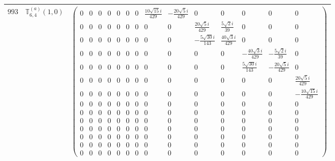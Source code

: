 \documentclass[fleqn,8pt,landscape]{jsarticle}
\begin{document}
\begin{center}
\begin{longtable}{ccc}
$ 993 $ & $ \mathbb{T}_{6,4}^{(a)}(1,0) $ & $ \begin{pmatrix} 0 & 0 & 0 & 0 & 0 & 0 & 0 & \frac{10 \sqrt{15} i}{429} & - \frac{20 \sqrt{5} i}{429} & 0 & 0 & 0 & 0 & 0 \\ 0 & 0 & 0 & 0 & 0 & 0 & 0 & 0 & 0 & \frac{20 \sqrt{5} i}{429} & \frac{5 \sqrt{2} i}{39} & 0 & 0 & 0 \\ 0 & 0 & 0 & 0 & 0 & 0 & 0 & 0 & 0 & - \frac{5 \sqrt{30} i}{143} & \frac{40 \sqrt{3} i}{429} & 0 & 0 & 0 \\ 0 & 0 & 0 & 0 & 0 & 0 & 0 & 0 & 0 & 0 & 0 & - \frac{40 \sqrt{3} i}{429} & - \frac{5 \sqrt{2} i}{39} & 0 \\ 0 & 0 & 0 & 0 & 0 & 0 & 0 & 0 & 0 & 0 & 0 & \frac{5 \sqrt{30} i}{143} & - \frac{20 \sqrt{5} i}{429} & 0 \\ 0 & 0 & 0 & 0 & 0 & 0 & 0 & 0 & 0 & 0 & 0 & 0 & 0 & \frac{20 \sqrt{5} i}{429} \\ 0 & 0 & 0 & 0 & 0 & 0 & 0 & 0 & 0 & 0 & 0 & 0 & 0 & - \frac{10 \sqrt{15} i}{429} \\ 0 & 0 & 0 & 0 & 0 & 0 & 0 & 0 & 0 & 0 & 0 & 0 & 0 & 0 \\ 0 & 0 & 0 & 0 & 0 & 0 & 0 & 0 & 0 & 0 & 0 & 0 & 0 & 0 \\ 0 & 0 & 0 & 0 & 0 & 0 & 0 & 0 & 0 & 0 & 0 & 0 & 0 & 0 \\ 0 & 0 & 0 & 0 & 0 & 0 & 0 & 0 & 0 & 0 & 0 & 0 & 0 & 0 \\ 0 & 0 & 0 & 0 & 0 & 0 & 0 & 0 & 0 & 0 & 0 & 0 & 0 & 0 \\ 0 & 0 & 0 & 0 & 0 & 0 & 0 & 0 & 0 & 0 & 0 & 0 & 0 & 0 \\ 0 & 0 & 0 & 0 & 0 & 0 & 0 & 0 & 0 & 0 & 0 & 0 & 0 & 0 \end{pmatrix} $ \\ \hline

\end{longtable}
\end{center}
\end{document}
